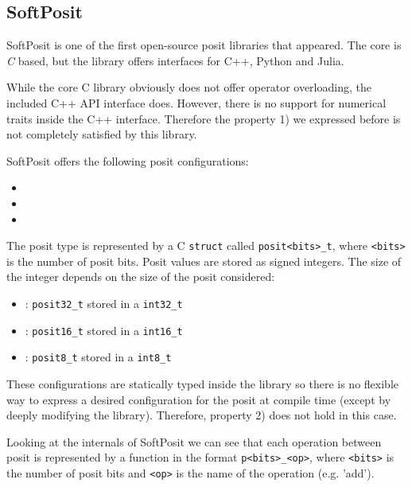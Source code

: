 \subsection{SoftPosit}

SoftPosit \cite{softposit} is one of the first open-source posit libraries that appeared. The core is \textit{C} based, but the library offers interfaces for C++, Python and Julia. 

While the core C library obviously does not offer operator overloading, the included C++ API interface does. However, there is no support for numerical traits inside the C++ interface. Therefore the property 1) we expressed before is not completely satisfied by this library.

SoftPosit offers the following posit configurations:
\begin{itemize}
    \item {}
    \item {}
    \item {}
\end{itemize}



The posit type is represented by a C \texttt{struct} called  \texttt{posit<bits>\_t}, where \texttt{<bits>} is the number of posit bits. Posit values are stored as signed integers. The size of the integer depends on the size of the posit considered:

\begin{itemize}
    \item {}: \texttt{posit32\_t} stored in a \texttt{int32\_t}
    \item {}: \texttt{posit16\_t} stored in a \texttt{int16\_t}
    \item {} : \texttt{posit8\_t}  stored in a \texttt{int8\_t}
\end{itemize}

These configurations are statically typed inside the library so there is no flexible way to express a desired configuration for the posit at compile time (except by deeply modifying the library). Therefore, property 2) does not hold in this case.

Looking at the internals of SoftPosit we can see that each operation between posit is represented by a function in the format \texttt{p<bits>\_<op>}, where \texttt{<bits>} is the number of posit bits and \texttt{<op>} is the name of the operation (e.g. 'add').

